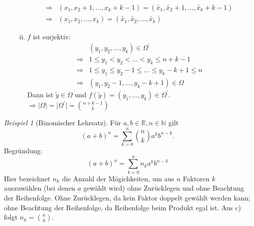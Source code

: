 \documentclass[a4paper,12pt,fleqn]{scrartcl}
\newcommand{\N}{\mathbb{N}}
\newcommand{\R}{\mathbb{R}}
\newcommand{\impl}{\Rightarrow}
\theoremstyle{definition}
\theoremstyle{plain}
\theoremstyle{remark}
\newtheorem*{beispiel}{Beispiel}
\begin{document}
\begin{enumerate}[a)]
\begin{enumerate}[(i)]
\begin{align*}
\impl & (x_1, x_2+1, \ldots, x_k+k-1) = (\widetilde{x_1}, \widetilde{x_2}+1, \ldots, \widetilde{x_k}+k-1) \\
\impl & (x_1, x_2, \ldots, x_k) = (\widetilde{x_1}, \widetilde{x_2}, \ldots, \widetilde{x_k})
\end{align*}
\item $f$ ist surjektiv:
\begin{align*}
&(y_1, y_2, \ldots, y_k) \in \Omega^\prime \\
\impl & 1 \leq y_1 < y_2 <\ldots < y_k \leq n+k-1 \\
\impl & 1 \leq y_1 \leq y_2-1 \leq \ldots \leq y_k-k+1 \leq n \\
\impl & (y_1,y_2-1, \ldots , y_k-k+1) \in \Omega
\end{align*}
Dann ist $\widetilde{y} \in \Omega$ und $f(\widetilde{y})=(y_1, \ldots, y_k) \in \Omega^\prime$. \\
$\impl \mid \Omega \mid = \mid \Omega^\prime \mid = \binom{n+k-1}{k}$
\end{enumerate}
\end{enumerate}
\begin{beispiel}[Binomischer Lehrsatz]
Für $a, b \in \R, n \in \N$ gilt 
\[(a+b)^{n} = \sum_{k=0}^{n} \binom{n}{k} a^{k} b^{n-k}.\]
Begründung:
\[(a+b)^{n} = \sum_{k=0}^{n} n_k a^{k} b^{n-k}\]
Hier bezeichnet $n_k$ die Anzahl der Mögichkeiten, um aus $n$ Faktoren $k$ auszuwählen (bei denen $a$ gewählt wird) ohne Zurücklegen und ohne Beachtung der Reihenfolge. Ohne Zurücklegen, da kein Faktor doppelt gewählt werden kann; ohne Beachtung der Reihenfolge, da Reihenfolge beim Produkt egal ist. Aus c) folgt $n_k = \binom{n}{k}$.
\end{beispiel}
\end{document}
